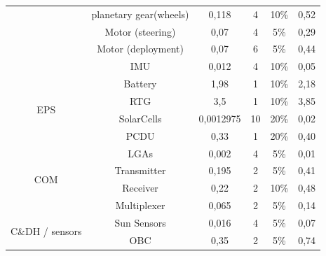 \begin{table}[]
{\begin{tabular}{cccccc}
                                         & planetary gear(wheels)              & 0,118                       & 4        & 10\%             & 0,52           \\
                                         & Motor (steering)                    & 0,07                        & 4        & 5\%              & 0,29           \\
                                         & Motor (deployment)                  & 0,07                        & 6        & 5\%              & 0,44           \\
                                         & IMU                                 & 0,012                       & 4        & 10\%             & 0,05           \\
\multirow{4}{*}{EPS}                     & Battery                             & 1,98                        & 1        & 10\%             & 2,18           \\
                                         & RTG                                 & 3,5                         & 1        & 10\%             & 3,85           \\
                                         & SolarCells                          & 0,0012975                   & 10       & 20\%             & 0,02           \\
                                         & PCDU                                & 0,33                        & 1        & 20\%             & 0,40           \\
\multirow{4}{*}{COM}                     & LGAs                                & 0,002                       & 4        & 5\%              & 0,01           \\
                                         & Transmitter                         & 0,195                       & 2        & 5\%              & 0,41           \\
                                         & Receiver                            & 0,22                        & 2        & 10\%             & 0,48           \\
                                         & Multiplexer                         & 0,065                       & 2        & 5\%              & 0,14           \\
\multirow{4}{*}{C\&DH / sensors}         & Sun Sensors                         & 0,016                       & 4        & 5\%              & 0,07           \\
                                         & OBC                                 & 0,35                        & 2        & 5\%              & 0,74           \\

\end{tabular}}
\end{table}
